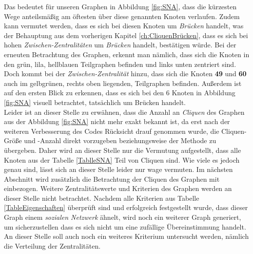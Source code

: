 Das bedeutet für unseren Graphen in Abbildung \ref{fig:SNA}, dass die kürzesten Wege anteilsmäßig am öftesten über diese genannten Knoten verlaufen. Zudem kann vermutet werden, dass es sich bei diesen Knoten um \textit{Brücken} handelt, was der Behauptung aus dem vorherigen Kapitel \ref{ch:CliquenBrücken}, dass es sich bei hohen \textit{Zwischen-Zentralitäten} um \textit{Brücken} handelt, bestätigen würde. Bei der erneuten Betrachtung des Graphen, erkennt man nämlich, dass sich die Knoten in den grün, lila, hellblauen Teilgraphen befinden und links unten zentriert sind. Doch kommt bei der \textit{Zwischen-Zentralität} hinzu, dass sich die Knoten \textbf{49} und \textbf{60} auch im gelbgrünen, rechts oben liegenden, Teilgraphen befinden. Außerdem ist auf den ersten Blick zu erkennen, dass es sich bei den 6 Knoten in Abbildung \ref{fig:SNA} visuell betrachtet, tatsächlich um Brücken handelt. \\

Leider ist an dieser Stelle zu erwähnen, dass die Anzahl an \textit{Cliquen} des Graphen aus der Abbildung \ref{fig:SNA} nicht mehr exakt bekannt ist, da erst nach der weiteren Verbesserung des Codes Rücksicht drauf genommen wurde, die Cliquen-Größe und -Anzahl direkt vorzugeben beziehungsweise der Methode zu übergeben. Daher wird an dieser Stelle nur die Vermutung aufgestellt, dass alle Knoten aus der Tabelle \ref{TablleSNA} Teil von Cliquen sind. Wie viele es jedoch genau sind, lässt sich an dieser Stelle leider nur wage vermuten. Im nächsten Abschnitt wird zusätzlich die Betrachtung der Cliquen des Graphen mit einbezogen. Weitere Zentralitätswerte und Kriterien des Graphen werden an dieser Stelle nicht betrachtet. Nachdem alle Kriterien aus Tabelle \ref{TableEigenschaften} überprüft sind und erfolgreich festgestellt wurde, dass dieser Graph einem \textit{sozialen Netzwerk} ähnelt, wird noch ein weiterer Graph generiert, um sicherzustellen dass es sich nicht um eine zufällige Übereinstimmung handelt. An dieser Stelle soll auch noch ein weiteres Kriterium untersucht werden, nämlich die Verteilung der Zentralitäten.


\newpage
